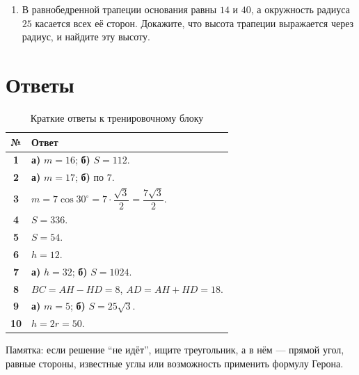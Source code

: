 \documentclass[a4paper,12pt]{article}
\newcommand{\med}{m}
\newcommand{\Area}{S}
\begin{document}
\begin{enumerate}[label=\textbf{\arabic*.},start=10]
    \item В равнобедренной трапеции основания равны $14$ и $40$, а окружность радиуса $25$ касается всех её сторон. Докажите, что высота трапеции выражается через радиус, и найдите эту высоту.
\end{enumerate}

\newpage

\section*{\centering \textcolor{darkaccent}{Ответы}}

\renewcommand{\arraystretch}{1.35}

\begin{table}[h!]
\centering
\caption{Краткие ответы к тренировочному блоку}
\begin{tabularx}{\linewidth}{>{\bfseries}c X}
\toprule
№ & Ответ \\ 
\midrule
1 & \textbf{а)} $\med=16$; \textbf{б)} $\Area=112$. \\
2 & \textbf{а)} $\med=17$; \textbf{б)} по $7$. \\
3 & $\med=7\cos 30^\circ=7\cdot \dfrac{\sqrt3}{2}= \dfrac{7\sqrt3}{2}$. \\
4 & $\Area=336$. \\
5 & $\Area=54$. \\
6 & $h=12$. \\
7 & \textbf{а)} $h=32$; \textbf{б)} $\Area=1024$. \\
8 & $BC=AH-HD=8$, \quad $AD=AH+HD=18$. \\
9 & \textbf{а)} $\med=5$; \textbf{б)} $\Area=25\sqrt3$. \\
10 & $h=2r=50$. \\
\bottomrule
\end{tabularx}
\end{table}

\vfill

{\small
\textcolor{softgray}{Памятка: если решение ``не идёт'', ищите треугольник, а в нём --- прямой угол, равные стороны, известные углы или возможность применить формулу Герона.}
}
\end{document}
